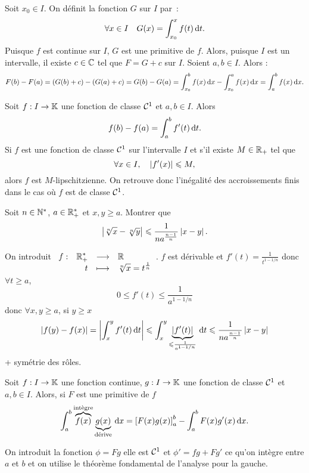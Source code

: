 \documentclass{magnolia}
\begin{document}
\begin{preuve}
Soit $x_0 \in I$.
On définit la fonction $G$ sur $I$ par~:
\[\forall x\in I \quad G(x)=\int_{x_0}^{x} f(t)\,\text{d}t.\]
Puisque $f$ est continue sur $I$, $G$ est une primitive de $f$. Alors, puisque $I$ est un intervalle, il existe $c\in \mathbb{C}$ tel que $F=G+c$ sur $I$. Soient $a,b\in I$. Alors :
$$F(b)-F(a)=(G(b)+c)-(G(a)+c)=G(b)-G(a)=\int_{x_0}^{b} f(x)\,\text{d}x-\int_{x_0}^{a} f(x)\,\text{d}x=\int_{a}^{b} f(x)\,\text{d}x.$$
\end{preuve}

\begin{remarques}
\remarque Soit $f:I\to\mathbb{K}$ une fonction de classe $\mathcal{C}^{1}$  et
  $a,b\in I$. Alors
  \[f(b)-f(a)=\int_{a}^{b} f'(t)\,\text{d}t.\]
\remarque[utile=3] Si $f$ est une fonction de classe $\mathcal{C}^{1}$ sur
  l'intervalle $I$ et s'il existe $M\in\mathbb{R}_+$ tel que
  \[\forall x\in I ,\quad \left|f'(x)\right|\leqslant M,\]
  alors $f$ est $M$-lipschitzienne. On retrouve donc l'inégalité des
  accroissements finis dans le cas où $f$ est de classe $\mathcal{C}^{1}$.  
\end{remarques}

\begin{exoUnique}
\exo[utile=2] Soit $n\in{\mathbb{N}^*}$, $a\in\mathbb{R}_+^*$ et $x,y\geq a$. Montrer que
  \[\left|\sqrt[n]{x}-\sqrt[n]{y}\right|\leqslant\frac{1}{na^{\frac{n-1}{n}}}\left|x-y\right|.\]
  \begin{sol}
On introduit $\begin{array}[t]{lrcl} \displaystyle{f} : & \displaystyle{\mathbb{R}_+^*} & \longrightarrow & \displaystyle{\mathbb{R}} \\ & \displaystyle{t} & \longmapsto & \displaystyle{\sqrt[n]{x}=t^{\frac{1}{n}}} \end{array}$. $f$ est dérivable et $f'(t)=\frac{1}{t^{1-1/n}}$ donc $\forall t \geq a$, $$0\leq f'(t)\leq \frac{1}{a^{1-1/n}}$$ donc $\forall x,y\geq a$, si $y\geq x$
$$\left|f(y)-f(x)\right|=\left|\int_{x}^{y} f'(t)\,\text{d}t\right|\leqslant \int_{x}^{y} \underbrace{\left|f'(t)\right|}_{\leqslant \frac{1}{a^{1-1/n}}}\,\text{d}t\leqslant \frac{1}{na^{\frac{n-1}{n}}}\left|x-y\right|$$ + symétrie des rôles.
  \end{sol}
\end{exoUnique}

\begin{proposition}[nom={Intégration par parties}]
Soit $f:I\to\mathbb{K}$ une fonction continue, $g:I\to\mathbb{K}$ une fonction
de classe $\mathcal{C}^{1}$ et $a,b\in I$. Alors, si $F$ est une primitive de $f$
\[\int_{a}^{b} \overbrace{f(x)}^{\text{int\`egre}} \underbrace{g(x)}_{\text{d\'erive}}\,\text{d}x=\left[ F(x)g(x) \right]_{a}^{b}-
  \int_{a}^{b} F(x)g'(x)\,\text{d}x.\]
\end{proposition}

\begin{preuve}
On introduit la fonction $\phi=Fg$ elle est $\mathcal{C}^{1}$ et $\phi'=fg+Fg'$ ce qu'on intègre entre $a$ et $b$ et on utilise le théorème fondamental de l'analyse pour la gauche.
\end{preuve}
\end{document}
